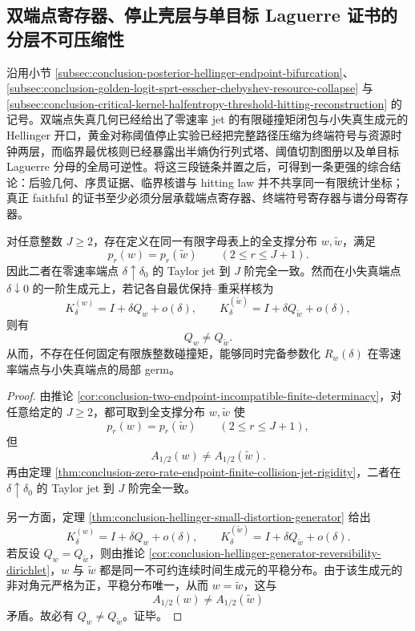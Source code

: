 \subsection{双端点寄存器、停止壳层与单目标 Laguerre 证书的分层不可压缩性}\label{subsec:conclusion-endpoint-stopping-halfentropy-laguerre-register-rigidity}
沿用小节 \ref{subsec:conclusion-posterior-hellinger-endpoint-bifurcation}、\ref{subsec:conclusion-golden-logit-sprt-esscher-chebyshev-resource-collapse} 与 \ref{subsec:conclusion-critical-kernel-halfentropy-threshold-hitting-reconstruction} 的记号。双端点失真几何已经给出了零速率 jet 的有限碰撞矩闭包与小失真生成元的 Hellinger 开口，黄金对称阈值停止实验已经把完整路径压缩为终端符号与资源时钟两层，而临界最优核则已经暴露出半熵伪行列式塔、阈值切割图册以及单目标 Laguerre 分母的全局可逆性。将这三段链条并置之后，可得到一条更强的综合结论：后验几何、序贯证据、临界核谱与 hitting law 并不共享同一有限统计坐标；真正 faithful 的证书至少必须分层承载端点寄存器、终端符号寄存器与谱分母寄存器。

\begin{theorem}[双端点几何不存在统一的有限整数矩坐标]\label{thm:conclusion-endpoint-no-unified-finite-integer-moment-coordinate}
对任意整数 \(J\ge 2\)，存在定义在同一有限字母表上的全支撑分布 \(w,\widetilde w\)，满足
\[
p_r(w)=p_r(\widetilde w)\qquad (2\le r\le J+1).
\]
因此二者在零速率端点 \(\delta\uparrow \delta_0\) 的 Taylor jet 到 \(J\) 阶完全一致。然而在小失真端点 \(\delta\downarrow 0\) 的一阶生成元上，若记各自最优保持--重采样核为
\[
K_\delta^{(w)}=I+\delta Q_w+o(\delta),
\qquad
K_\delta^{(\widetilde w)}=I+\delta Q_{\widetilde w}+o(\delta),
\]
则有
\[
Q_w\ne Q_{\widetilde w}.
\]
从而，不存在任何固定有限族整数碰撞矩，能够同时完备参数化 \(R_w(\delta)\) 在零速率端点与小失真端点的局部 germ。
\end{theorem}
\begin{proof}
由推论 \ref{cor:conclusion-two-endpoint-incompatible-finite-determinacy}，对任意给定的 \(J\ge 2\)，都可取到全支撑分布 \(w,\widetilde w\) 使
\[
p_r(w)=p_r(\widetilde w)\qquad (2\le r\le J+1),
\]
但
\[
A_{1/2}(w)\ne A_{1/2}(\widetilde w).
\]
再由定理 \ref{thm:conclusion-zero-rate-endpoint-finite-collision-jet-rigidity}，二者在 \(\delta\uparrow\delta_0\) 的 Taylor jet 到 \(J\) 阶完全一致。

另一方面，定理 \ref{thm:conclusion-hellinger-small-distortion-generator} 给出
\[
K_\delta^{(w)}=I+\delta Q_w+o(\delta),
\qquad
K_\delta^{(\widetilde w)}=I+\delta Q_{\widetilde w}+o(\delta).
\]
若反设 \(Q_w=Q_{\widetilde w}\)，则由推论 \ref{cor:conclusion-hellinger-generator-reversibility-dirichlet}，\(w\) 与 \(\widetilde w\) 都是同一不可约连续时间生成元的平稳分布。由于该生成元的非对角元严格为正，平稳分布唯一，从而 \(w=\widetilde w\)，这与
\[
A_{1/2}(w)\ne A_{1/2}(\widetilde w)
\]
矛盾。故必有 \(Q_w\ne Q_{\widetilde w}\)。证毕。
\end{proof}


